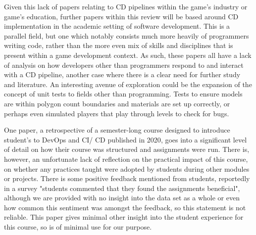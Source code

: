 \documentclass[journal]{IEEEtran}
\begin{document}
Given this lack of papers relating to CD pipelines within the game's industry or game's education, further papers within this review will be based around CD implementation in the academic setting of software development. This is a parallel field, but one which notably consists much more heavily of programmers writing code, rather than the more even mix of skills and disciplines that is present within a game development context. As such, these papers all have a lack of analysis on how developers other than programmers respond to and interact with a CD pipeline, another case where there is a clear need for further study and literature. An interesting avenue of exploration could be the expansion of the concept of unit tests to fields other than programming. Tests to ensure models are within polygon count boundaries and materials are set up correctly, or perhaps even simulated players that play through levels to check for bugs\cite{gordillo2021improving}.


One paper, a retrospective of a semester-long course designed to introduce student's to DevOps and CI/ CD published in 2020\cite{introdevops}, goes into a significant level of detail on how their course was structured and assignments were run. There is, however, an unfortunate lack of reflection on the practical impact of this course, on whether any practices taught were adopted by students during other modules or projects. There is some positive feedback mentioned from students, reportedly in a survey "students commented that they found the assignments beneficial"\cite[p.88]{introdevops}, although we are provided with no insight into the data set as a whole or even how common this sentiment was amongst the feedback, so this statement is not reliable. This paper gives minimal other insight into the student experience for this course, so is of minimal use for our purpose.
\end{document}
